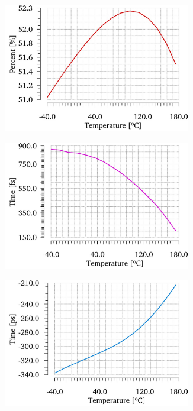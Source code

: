 \begin{figure}[htp]
    \centering
    \begin{subfigure}[b]{0.32\textwidth}
        \includegraphics[width=0.9\textwidth]{Chapter5/Figs/lvds/duty_cycle_vcm0_4V.jpg}
    \end{subfigure}
    \begin{subfigure}[b]{0.32\textwidth}
        \includegraphics[width=0.9\textwidth]{Chapter5/Figs/lvds/period_jitter_vcm0_4V.jpg}
    \end{subfigure}
    \begin{subfigure}[b]{0.32\textwidth}
        \includegraphics[width=0.9\textwidth]{Chapter5/Figs/lvds/period_error_vcm0_4V.jpg}

\end{subfigure}
\end{figure}
